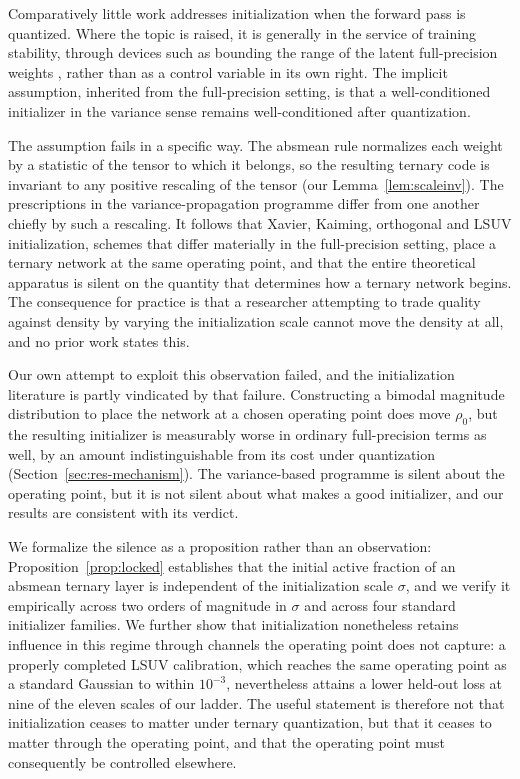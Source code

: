 \documentclass[final,5p,times,twocolumn]{elsarticle}
\theoremstyle{remark}
\newcommand{\rhoz}{\rho_{0}}
\begin{document}
Comparatively little work addresses initialization when the forward pass is
quantized. Where the topic is raised, it is generally in the service of
training stability, through devices such as bounding the range of the latent
full-precision weights \cite{hubara2016,zhou2016}, rather than as a control
variable in its own right. The implicit assumption, inherited from the
full-precision setting, is that a well-conditioned initializer in the
variance sense remains well-conditioned after quantization.

The assumption fails in a specific way. The
absmean rule normalizes each weight by a statistic of the tensor to which it
belongs, so the resulting ternary code is invariant to any positive rescaling
of the tensor (our Lemma~\ref{lem:scaleinv}). The prescriptions in the
variance-propagation programme differ from one another chiefly by such a
rescaling. It follows that Xavier, Kaiming, orthogonal and LSUV
initialization, schemes that differ materially in the full-precision
setting, place a ternary network at the same operating point, and that the
entire theoretical apparatus is silent on the quantity that determines how a
ternary network begins. The consequence for practice is that a researcher
attempting to trade quality against density by varying the initialization
scale cannot move the density at all, and no prior work states this.

Our own attempt to exploit this observation failed, and the initialization
literature is partly vindicated by that failure. Constructing a bimodal magnitude distribution to
place the network at a chosen operating point does move $\rhoz$, but the
resulting initializer is measurably worse in ordinary full-precision
terms as well, by an amount indistinguishable from its cost under quantization
(Section~\ref{sec:res-mechanism}). The variance-based programme is silent about
the operating point, but it is not silent about what makes a good initializer,
and our results are consistent with its verdict.

We formalize the silence as a proposition rather than an observation:
Proposition~\ref{prop:locked} establishes that the initial active fraction of
an absmean ternary layer is independent of the initialization scale $\sigma$,
and we verify it empirically across two orders of magnitude in $\sigma$ and
across four standard initializer families. We further show that initialization
nonetheless retains influence in this regime through channels the operating
point does not capture: a properly completed LSUV calibration, which reaches
the same operating point as a standard Gaussian to within $10^{-3}$,
nevertheless attains a lower held-out loss at nine of the eleven scales of
our ladder. The
useful statement is therefore not that initialization ceases to matter under
ternary quantization, but that it ceases to matter through the operating
point, and that the operating point must consequently be controlled
elsewhere.
\end{document}
